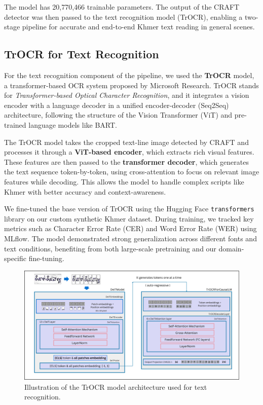 The model has 20,770,466 trainable parameters. The output of the CRAFT detector was then passed to the text recognition 
model (TrOCR), enabling a two-stage pipeline for accurate and end-to-end 
Khmer text reading in general scenes.

\subsection{TrOCR for Text Recognition}
\label{subsec:trocr}

For the text recognition component of the pipeline, we used the \textbf{TrOCR} model, 
a transformer-based OCR system proposed by Microsoft Research. TrOCR stands for 
\textit{Transformer-based Optical Character Recognition}, and it integrates a vision 
encoder with a language decoder in a unified encoder-decoder (Seq2Seq) architecture, 
following the structure of the Vision Transformer (ViT) and pre-trained language models 
like BART.

The TrOCR model takes the cropped text-line image detected by CRAFT and processes it through a \textbf{ViT-based encoder}, which extracts rich visual features. These features are then passed to the \textbf{transformer decoder}, which generates the text sequence token-by-token, using cross-attention to focus on relevant image features while decoding. This allows the model to handle complex scripts like Khmer with better accuracy and context-awareness.

We fine-tuned the base version of TrOCR using the Hugging Face \texttt{transformers} library on our custom synthetic Khmer dataset. During training, we tracked key metrics such as Character Error Rate (CER) and Word Error Rate (WER) using MLflow. The model demonstrated strong generalization across different fonts and text conditions, benefiting from both large-scale pretraining and our domain-specific fine-tuning.

\begin{figure}[ht]
    \centering
    \includegraphics[width=\textwidth]{figures/trocr_model.png}
    \caption{Illustration of the TrOCR model architecture used for text recognition.}
    \label{fig:trocr-model}
\end{figure}

